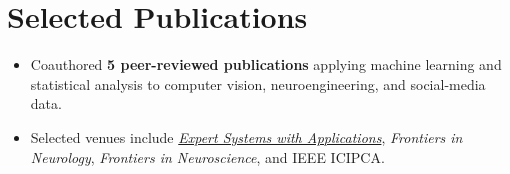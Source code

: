 \documentclass[letterpaper,10pt]{article}
\newcommand{\resumeItem}[1]{\item\footnotesize{#1\vspace{-2.5pt}}}
\begin{document}
\section{Selected Publications}
\begin{itemize}[leftmargin=0.17in,itemsep=0.7pt,topsep=1pt,label={$\bullet$}]
\resumeItem{Coauthored \textbf{5 peer-reviewed publications} applying machine learning and statistical analysis to computer vision, neuroengineering, and social-media data.}
\resumeItem{Selected venues include \href{https://doi.org/10.1016/j.eswa.2025.129507}{\textit{Expert Systems with Applications}}, \textit{Frontiers in Neurology}, \textit{Frontiers in Neuroscience}, and IEEE ICIPCA.}
\end{itemize}
\vspace{-6pt}
\end{document}
